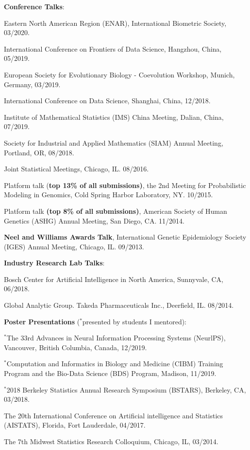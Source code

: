 \documentclass[letterpaper]{article}
\renewenvironment{itemize}{
  \begin{list}{}{
    \setlength{\leftmargin}{1.5em}
  }
}{
  \end{list}
}
\begin{document}
{\bf Conference Talks}:
\begin{itemize}
\item Eastern North American Region (ENAR), International Biometric Society, 03/2020.
\item International Conference on Frontiers of Data Science, Hangzhou, China, 05/2019.
\item European Society for Evolutionary Biology - Coevolution Workshop, Munich, Germany, 03/2019.
\item International Conference on Data Science, Shanghai, China, 12/2018.
\item Institute of Mathematical Statistics (IMS) China Meeting, Dalian, China, 07/2019.
\item Society for Industrial and Applied Mathematics (SIAM) Annual Meeting, Portland, OR, 08/2018.
\item Joint Statistical Meetings, Chicago, IL. 08/2016. 
\item Platform talk ({\bf top 13\% of all submissions)}, the 2nd Meeting for Probabilistic Modeling in Genomics, Cold Spring Harbor Laboratory, NY. 10/2015. 
\item Platform talk {\bf (top 8\% of all submissions)}, American Society of Human Genetics (ASHG) Annual Meeting, San Diego, CA. 11/2014.
\item {\bf Neel and Williams Awards Talk}, International Genetic Epidemiology Society (IGES) Annual Meeting, Chicago, IL. 09/2013.
\end{itemize}

{\bf Industry Research Lab Talks}:
\begin{itemize}
\item Bosch Center for Artificial Intelligence in North America, Sunnyvale, CA, 06/2018.
\item Global Analytic Group. Takeda Pharmaceuticals Inc., Deerfield, IL. 08/2014.
\end{itemize}

{\bf Poster Presentations} ($^*$presented by students I mentored):
\begin{itemize}
\item $^*$The 33rd Advances in Neural Information Processing Systems (NeurlPS), Vancouver, British Columbia, Canada, 12/2019. 
\item $^*$Computation and Informatics in Biology and Medicine (CIBM) Training Program and the Bio-Data Science (BDS) Program, Madison, 11/2019. 
\item $^*$2018 Berkeley Statistics Annual Research Symposium (BSTARS), Berkeley, CA, 03/2018. 
\item The 20th International Conference on Artificial intelligence and Statistics (AISTATS), Florida, Fort Lauderdale, 04/2017. 
\item The 7th Midwest Statistics Research Colloquium, Chicago, IL, 03/2014.
\end{itemize}
\end{document}
